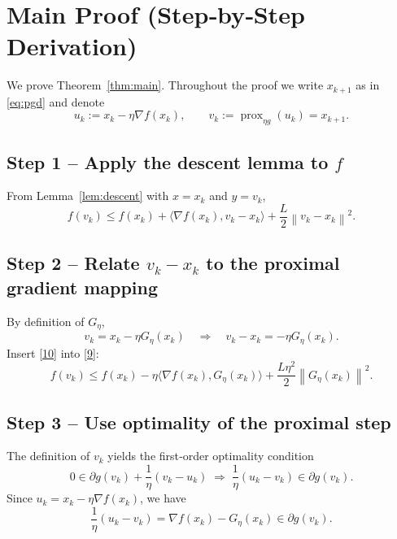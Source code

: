 \documentclass{article}
\newcommand{\prox}{\operatorname{prox}}
\newcommand{\grad}{\nabla}
\newcommand{\norm}[1]{\left\|#1\right\|}
\begin{document}
\section*{Main Proof (Step‑by‑Step Derivation)}
We prove Theorem~\ref{thm:main}.  Throughout the proof we write $x_{k+1}$ as in \eqref{eq:pgd} and denote
\[
u_{k}:=x_{k}-\eta\grad f(x_{k}),\qquad
v_{k}:=\prox_{\eta g}(u_{k})=x_{k+1}.
\]

\subsection*{Step 1 – Apply the descent lemma to $f$}
From Lemma~\ref{lem:descent} with $x=x_{k}$ and $y=v_{k}$,
\[
f(v_{k})\le f(x_{k})+\langle\grad f(x_{k}),v_{k}-x_{k}\rangle
+\frac{L}{2}\norm{v_{k}-x_{k}}^{2}.
\tag{9}
\]

\subsection*{Step 2 – Relate $v_{k}-x_{k}$ to the proximal gradient mapping}
By definition of $G_{\eta}$,
\[
v_{k}=x_{k}-\eta G_{\eta}(x_{k})\quad\Longrightarrow\quad
v_{k}-x_{k}=-\eta G_{\eta}(x_{k}).
\tag{10}
\]
Insert \eqref{10} into \eqref{9}:
\[
f(v_{k})\le f(x_{k})-\eta\langle\grad f(x_{k}),G_{\eta}(x_{k})\rangle
+\frac{L\eta^{2}}{2}\norm{G_{\eta}(x_{k})}^{2}.
\tag{11}
\]

\subsection*{Step 3 – Use optimality of the proximal step}
The definition of $v_{k}$ yields the first‑order optimality condition
\[
0\in \partial g(v_{k})+\frac{1}{\eta}(v_{k}-u_{k})
\;\Longrightarrow\;
\frac{1}{\eta}(u_{k}-v_{k})\in\partial g(v_{k}).
\tag{12}
\]
Since $u_{k}=x_{k}-\eta\grad f(x_{k})$, we have
\[
\frac{1}{\eta}(u_{k}-v_{k})=\grad f(x_{k})-G_{\eta}(x_{k})\in\partial g(v_{k}).
\tag{13}
\]
\end{document}
